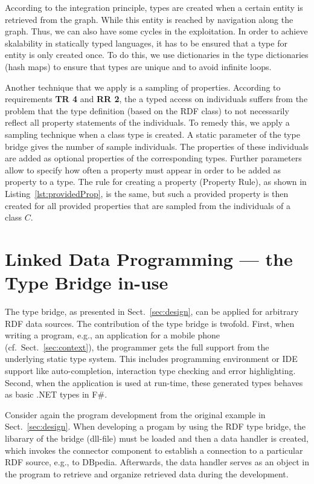 \documentclass{llncs} %
\newcommand{\fs}{\textsf{F\#}\xspace}
\newcommand{\rr}[1]{\textbf{RR #1}}
\newcommand{\tr}[1]{\textbf{TR #1}}
\begin{document}
According to the integration principle, types are created when a certain entity is retrieved from the graph. While this entity is reached
by navigation along the graph. Thus, we can also have some cycles in the exploitation. In order to achieve skalability in
statically typed languages, it has to be ensured that a type for entity is only created once.
To do this, we use dictionaries in the type dictionaries (hash maps) to ensure that types are unique and to avoid infinite loops.

Another technique that we apply is a sampling of properties. According to requirements \tr{4} and \rr{2}, the a typed access on individuals
suffers from the problem that the type definition (based on the RDF class) to not necessarily reflect all property statements
of the individuals. To remedy this, we apply a sampling technique when a class type is created.
A static parameter of the type bridge gives the number of sample individuals. The properties of these individuals
are added as optional properties of the corresponding types. Further parameters allow to specify
how often a property must appear in order to be added as property to a type.
The rule for creating a property (Property Rule), as shown in Listing~\ref{lst:providedProp},
is the same, but such a provided property is then created for all provided properties that are sampled from
the individuals of a class $C$.
	
\section{Linked Data Programming --- the Type Bridge in-use}
\label{sec:usage}

The type bridge, as presented in Sect.~\ref{sec:design}, can be applied for arbitrary RDF data sources.
The contribution of the type bridge is twofold. First, when writing a program, e.g., an application for a mobile phone (cf.~Sect.~\ref{sec:context}),
the programmer gets the full support from the underlying static type system. This includes programming environment
or IDE support like auto-completion, interaction type checking and error highlighting.
Second, when the application is used at run-time, these generated types behaves as basic .NET types in \fs.

Consider again the program development from the original example in Sect.~\ref{sec:design}.
When developing a progam by using the RDF type bridge, the libarary of the bridge (dll-file) must
be loaded and then a data handler is created, which invokes the connector component to
establish a connection to a particular RDF source, e.g., to DBpedia. Afterwards, the data handler
serves as an object in the program to retrieve and organize retrieved data during the development.
\end{document}
